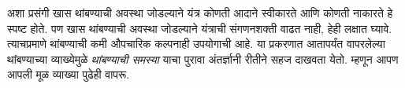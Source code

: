 \documentclass[../../../include/open-logic-section]{subfiles}
\begin{document}
\begin{explain}
अशा प्रसंगी खास थांबण्याची अवस्था जोडल्याने यंत्र कोणती आदाने
स्वीकारते आणि कोणती नाकारते हे स्पष्ट होते. पण खास थांबण्याची
अवस्था जोडल्याने यंत्राची संगणनशक्ती वाढत नाही, हेही लक्षात
घ्यावे. त्याचप्रमाणे थांबण्याची कमी औपचारिक कल्पनाही उपयोगाची
आहे. या प्रकरणात आतापर्यंत वापरलेल्या थांबण्याच्या व्याख्येमुळे
\emph{थांबण्याची समस्या} याचा पुरावा अंतर्ज्ञानी रीतीने
सहज दाखवता येतो. म्हणून आपण आपली मूळ व्याख्या पुढेही वापरू.
\end{explain}
\end{document}
